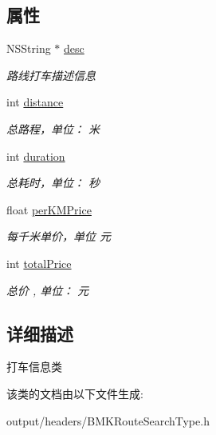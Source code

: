 \subsection*{属性}
\begin{DoxyCompactItemize}
\item 
\hypertarget{interface_b_m_k_taxi_info_a3f7635255548ce4a6baa13c6badc048d}{}N\+S\+String $\ast$ \hyperlink{interface_b_m_k_taxi_info_a3f7635255548ce4a6baa13c6badc048d}{desc}\label{interface_b_m_k_taxi_info_a3f7635255548ce4a6baa13c6badc048d}

\begin{DoxyCompactList}\small\item\em 路线打车描述信息 \end{DoxyCompactList}\item 
\hypertarget{interface_b_m_k_taxi_info_a0f40d0e207438cb15746b8f5c15dd0c7}{}int \hyperlink{interface_b_m_k_taxi_info_a0f40d0e207438cb15746b8f5c15dd0c7}{distance}\label{interface_b_m_k_taxi_info_a0f40d0e207438cb15746b8f5c15dd0c7}

\begin{DoxyCompactList}\small\item\em 总路程，单位： 米 \end{DoxyCompactList}\item 
\hypertarget{interface_b_m_k_taxi_info_af327eba903b8dd7873f3edffbc329dcc}{}int \hyperlink{interface_b_m_k_taxi_info_af327eba903b8dd7873f3edffbc329dcc}{duration}\label{interface_b_m_k_taxi_info_af327eba903b8dd7873f3edffbc329dcc}

\begin{DoxyCompactList}\small\item\em 总耗时，单位： 秒 \end{DoxyCompactList}\item 
\hypertarget{interface_b_m_k_taxi_info_a64631e889c0a36ccd3fa8c1596a25544}{}float \hyperlink{interface_b_m_k_taxi_info_a64631e889c0a36ccd3fa8c1596a25544}{per\+K\+M\+Price}\label{interface_b_m_k_taxi_info_a64631e889c0a36ccd3fa8c1596a25544}

\begin{DoxyCompactList}\small\item\em 每千米单价，单位 元 \end{DoxyCompactList}\item 
\hypertarget{interface_b_m_k_taxi_info_a4787f76e00a7c1a9cda736bfb9d6bd5e}{}int \hyperlink{interface_b_m_k_taxi_info_a4787f76e00a7c1a9cda736bfb9d6bd5e}{total\+Price}\label{interface_b_m_k_taxi_info_a4787f76e00a7c1a9cda736bfb9d6bd5e}

\begin{DoxyCompactList}\small\item\em 总价 , 单位： 元 \end{DoxyCompactList}\end{DoxyCompactItemize}


\subsection{详细描述}
打车信息类 

该类的文档由以下文件生成\+:\begin{DoxyCompactItemize}
\item 
output/headers/B\+M\+K\+Route\+Search\+Type.\+h\end{DoxyCompactItemize}
